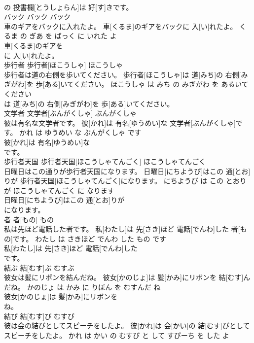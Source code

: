 \documentclass[8pt]{extreport}
\begin{document}
\begin{CJK}{UTF8}{min}
\\	の 投書欄[とうしょらん]は 好[す]きです。			
\\	バック	バック	バック	
\\	車のギアをバックに入れたよ。	車[くるま]のギアをバックに 入[い]れたよ。	くるま の ぎあ を ばっく に いれた よ	
\\	車[くるま]のギアを
\\	に 入[い]れたよ。			
\\	歩行者	歩行者[ほこうしゃ]	ほこうしゃ	
\\	歩行者は道の右側を歩いてください。	歩行者[ほこうしゃ]は 道[みち]の 右側[みぎがわ]を 歩[ある]いてください。	ほこうしゃ は みち の みぎがわ を あるいて ください	
\\	は 道[みち]の 右側[みぎがわ]を 歩[ある]いてください。			
\\	文学者	文学者[ぶんがくしゃ]	ぶんがくしゃ	
\\	彼は有名な文学者です。	彼[かれ]は 有名[ゆうめい]な 文学者[ぶんがくしゃ]です。	かれ は ゆうめい な ぶんがくしゃ です	
\\	彼[かれ]は 有名[ゆうめい]な
\\	です。			
\\	歩行者天国	歩行者天国[ほこうしゃてんごく]	ほこうしゃてんごく	
\\	日曜日はこの通りが歩行者天国になります。	日曜日[にちようび]はこの 通[とお]りが 歩行者天国[ほこうしゃてんごく]になります。	にちようび は この とおり が ほこうしゃてんごく に なります	
\\	日曜日[にちようび]はこの 通[とお]りが
\\	になります。			
\\	者	者[もの]	もの	
\\	私は先ほど電話した者です。	私[わたし]は 先[さき]ほど 電話[でんわ]した 者[もの]です。	わたし は さきほど でんわ した もの です	
\\	私[わたし]は 先[さき]ほど 電話[でんわ]した
\\	です。			
\\	結ぶ	結[むす]ぶ	むすぶ	
\\	彼女は髪にリボンを結んだね。	彼女[かのじょ]は 髪[かみ]にリボンを 結[むす]んだね。	かのじょ は かみ に りぼん を むすんだ ね	
\\	彼女[かのじょ]は 髪[かみ]にリボンを
\\	ね。			
\\	結び	結[むす]び	むすび	
\\	彼は会の結びとしてスピーチをしたよ。	彼[かれ]は 会[かい]の 結[むす]びとしてスピーチをしたよ。	かれ は かい の むすび と して すぴーち を した よ	

\end{CJK}
\end{document}
